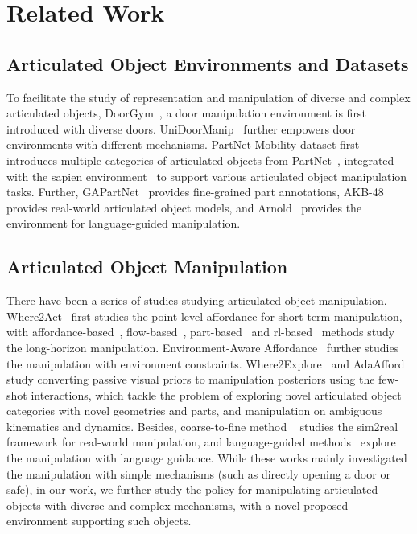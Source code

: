 \section{Related Work}
\vspace{-0.1cm}

\subsection{Articulated Object Environments and Datasets}
\vspace{-0.2cm}


To facilitate the study of representation and manipulation of diverse and complex articulated objects,
DoorGym~\citep{urakami2019doorgym}, a door manipulation environment is first introduced with diverse doors.
UniDoorManip~\citep{li2024unidoormanip} further empowers door environments with different mechanisms.
PartNet-Mobility dataset first introduces multiple categories of articulated objects from PartNet~\citep{Mo_2019_CVPR, Chang2015ShapeNetAI}, integrated with the sapien environment~\citep{xiang2020sapien, mu2021maniskill, gu2023maniskill2} to support various articulated object manipulation tasks. 
Further, GAPartNet~\citep{geng2023gapartnet} provides fine-grained part annotations, AKB-48~\citep{liu2022akb} provides real-world articulated object models, and Arnold~\citep{gong2023arnold} provides the environment for language-guided manipulation.

\vspace{-0.2cm}
\subsection{Articulated Object Manipulation}
\vspace{-0.2cm}

There have been a series of studies studying articulated object manipulation.
Where2Act~\citep{Mo_2021_ICCV} first studies the point-level affordance for short-term manipulation,
with affordance-based~\citep{wu2022vatmart}, flow-based~\citep{eisner2022flowbot3d, zhang2023flowbot++}, part-based~\citep{geng2023partmanip} and rl-based~\citep{geng2022end} methods study the long-horizon manipulation.
Environment-Aware Affordance~\citep{wu2023learningenv, li2024mobileafford} further studies the manipulation with environment constraints.
Where2Explore~\citep{ning2023where2explore} and AdaAfford~\citep{wang2021adaafford} study converting passive visual priors to manipulation posteriors using the few-shot interactions, which tackle the problem of exploring novel articulated object categories with novel geometries and parts, and manipulation on ambiguous kinematics and dynamics. 
Besides, coarse-to-fine method ~\citep{ling2024articulated} studies the sim2real framework for real-world manipulation, and language-guided methods~\citep{xu2024naturalvlm, gong2023arnold} explore the manipulation with language guidance.
While these works mainly investigated the manipulation with simple mechanisms (such as directly opening a door or safe), in our work,
we further study the policy for manipulating articulated objects with diverse and complex mechanisms, with a novel proposed environment supporting such objects.

\vspace{-0.2cm}